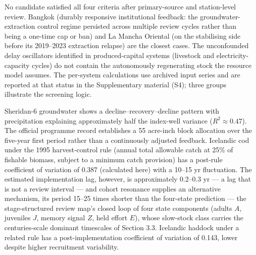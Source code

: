 \documentclass[11pt]{article}
\begin{document}
No candidate satisfied all four criteria after primary-source and
station-level review. Bangkok (durably responsive institutional feedback: the groundwater-extraction control regime persisted across multiple review cycles rather than being a one-time cap or ban) and La Mancha Oriental (on the
stabilising side before its 2019--2023 extraction relapse) are the
closest cases. The unconfounded delay oscillators identified in
produced-capital systems (livestock and electricity-capacity cycles) do
not contain the autonomously regenerating stock the resource model
assumes. The per-system calculations use archived input series and are reported at that status in the
Supplementary material (S4); three groups illustrate the screening logic.

Sheridan-6 groundwater shows a decline--recovery--decline pattern with
precipitation explaining approximately half the index-well variance
(\(R^2\approx0.47\)). The official programme record establishes a 55
acre-inch block allocation over the five-year first period rather than a
continuously adjusted feedback. Icelandic cod under the 1995
harvest-control rule (annual total allowable catch at 25\% of fishable
biomass, subject to a minimum catch provision) has a post-rule coefficient of variation of 0.387 (calculated here) with a 10--15 yr
fluctuation. The estimated implementation lag, however, is approximately
0.2--0.3 yr --- a lag that is not a review interval --- and cohort
resonance supplies an alternative mechanism, its period 15--25 times
shorter than the four-state prediction --- the stage-structured review
map's closed loop of four state components (adults \(A\), juveniles
\(J\), memory signal \(Z\), held effort \(E\)), whose slow-stock class
carries the centuries-scale dominant timescales of Section 3.3.
Icelandic haddock under a related rule has a post-implementation
coefficient of variation of 0.143, lower despite higher recruitment
variability.
\end{document}
